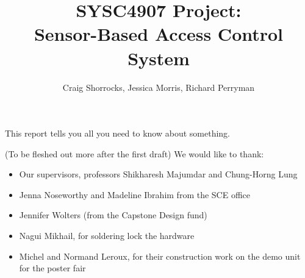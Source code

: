 \documentclass[12pt]{report}
\begin{document}
\title{SYSC4907 Project: \\ Sensor-Based Access Control System}
\author{
    Craig Shorrocks,
    Jessica Morris,
    Richard Perryman
}

\copyrightfalse %

\beforepreface


    This report tells you all you need to know about something.


    (To be fleshed out more after the first draft)
    We would like to thank:
    \begin{itemize}
    \item Our supervisors, professors Shikharesh Majumdar and Chung-Horng Lung
    \item Jenna Noseworthy and Madeline Ibrahim from the SCE office
    \item Jennifer Wolters (from the Capstone Design fund)
    \item Nagui Mikhail, for soldering lock the hardware
    \item Michel and Normand Leroux, for their construction work on the demo unit for the poster fair
    \end{itemize}



\prefaceTOC   %
\listoffigures   %
\listoftables   %

                    
\end{document}
